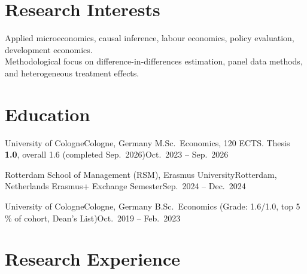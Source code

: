 \documentclass[serif]{../shared/OpenCV}
\begin{document}
\cvheader


\section*{Research Interests}
\small
Applied microeconomics, causal inference, labour economics, policy evaluation, development economics. \\
Methodological focus on difference-in-differences estimation, panel data methods, and heterogeneous treatment effects.

\section*{Education}
\resumeSubHeadingListStart

\resumeSubheading
{University of Cologne}{Cologne, Germany}
{M.Sc.\ Economics, 120 ECTS. Thesis \textbf{1.0}, overall 1.6 (completed Sep.\ 2026)}{Oct.\ 2023 -- Sep.\ 2026}
\resumeItemListStart
{}
\resumeItemListEnd

\resumeSubheading
{Rotterdam School of Management (RSM), Erasmus University}{Rotterdam, Netherlands}
{Erasmus+ Exchange Semester}{Sep.\ 2024 -- Dec.\ 2024}
\resumeItemListStart
{}
\resumeItemListEnd

\resumeSubheading
{University of Cologne}{Cologne, Germany}
{B.Sc.\ Economics (Grade: 1.6/1.0, top 5\,\% of cohort, Dean's List)}{Oct.\ 2019 -- Feb.\ 2023}

\resumeSubHeadingListEnd

\section*{Research Experience}
\resumeSubHeadingListStart
\end{document}
